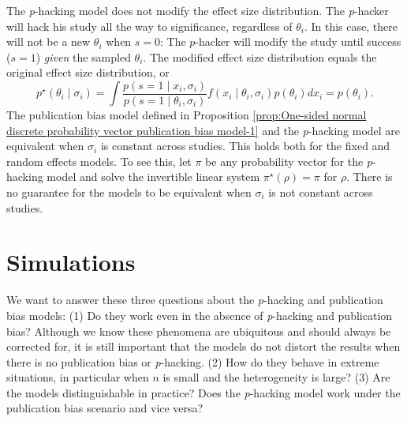 \documentclass[useAMS,usenatbib,referee]{biom}
\begin{document}
The \textit{p}-hacking model does not modify the effect size distribution. The \textit{p}-hacker will hack his study all the way to significance, regardless of $\theta_i$. In this case, there will not be a new $\theta_i$ when $s=0$: The $p$-hacker will modify the study until success ($s=1$) \emph{given} the sampled $\theta_i$. The modified effect size distribution equals the original effect size distribution, or
\[
p^\star(\theta_i\mid \sigma_i)=\int\frac{p(s=1\mid x_i, \sigma_i)}{p(s=1\mid \theta_i, \sigma_i)}f(x_i \mid \theta_i, \sigma _i) p(\theta_i)dx_i = p(\theta_i).
\]
The publication bias model defined in Proposition \ref{prop:One-sided normal discrete probability vector publication bias model-1} and the \textit{p}-hacking model are equivalent when $\sigma_{i}$ is constant across studies. This holds both for the fixed and random effects models. To see this, let $\pi$ be any probability vector for the \textit{p}-hacking model and solve the invertible linear system $\pi^{\star}(\rho)=\pi$ for $\rho$. There is no guarantee for the models to be equivalent when $\sigma_{i}$ is not constant across studies. 
\section{Simulations}\label{sect:simulations}

We want to answer these three questions about the \textit{p}-hacking and publication bias models: (1) Do they work even in the absence of \textit{p}-hacking and publication bias? Although we know these phenomena are ubiquitous and should always be corrected for, it is still important that the models do not distort the results when there is no publication bias or \textit{p}-hacking. (2) How do they behave in extreme situations, in particular when $n$ is small and the heterogeneity is large? (3) Are the models distinguishable in practice? Does the \textit{p}-hacking model work under the publication bias scenario and vice versa?
\end{document}
